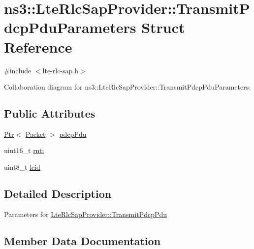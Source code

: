 \hypertarget{structns3_1_1LteRlcSapProvider_1_1TransmitPdcpPduParameters}{}\section{ns3\+:\+:Lte\+Rlc\+Sap\+Provider\+:\+:Transmit\+Pdcp\+Pdu\+Parameters Struct Reference}
\label{structns3_1_1LteRlcSapProvider_1_1TransmitPdcpPduParameters}


{\ttfamily \#include $<$lte-\/rlc-\/sap.\+h$>$}



Collaboration diagram for ns3\+:\+:Lte\+Rlc\+Sap\+Provider\+:\+:Transmit\+Pdcp\+Pdu\+Parameters\+:
\subsection*{Public Attributes}
\begin{DoxyCompactItemize}
\item 
\hyperlink{classns3_1_1Ptr}{Ptr}$<$ \hyperlink{classns3_1_1Packet}{Packet} $>$ \hyperlink{structns3_1_1LteRlcSapProvider_1_1TransmitPdcpPduParameters_ad9922f1c050ba920952f2462bd7f5b35}{pdcp\+Pdu}
\item 
uint16\+\_\+t \hyperlink{structns3_1_1LteRlcSapProvider_1_1TransmitPdcpPduParameters_ae45983256107cc1b165ad80052dd44be}{rnti}
\item 
uint8\+\_\+t \hyperlink{structns3_1_1LteRlcSapProvider_1_1TransmitPdcpPduParameters_a1520cf6e30e8a17f56f2433ba1b0ea0f}{lcid}
\end{DoxyCompactItemize}


\subsection{Detailed Description}
Parameters for \hyperlink{classns3_1_1LteRlcSapProvider_ad2bdc756a034aa21c163da2deb705a50}{Lte\+Rlc\+Sap\+Provider\+::\+Transmit\+Pdcp\+Pdu} 

\subsection{Member Data Documentation}

